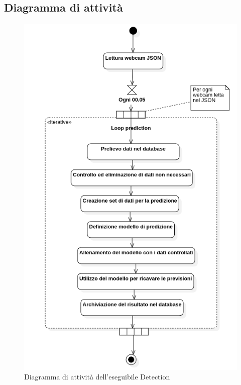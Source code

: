 \subsection{Diagramma di attività}\label{ArchitetturaDelProdottoArchitetturaModuloPredictionDiagrammaDiAttività}
\begin{figure}[H]
  \begin{center}
    \includegraphics[scale=0.6]{../immagini/diag_PB/prediction_activity.png}
    \caption{Diagramma di attività dell'eseguibile Detection}
  \end{center}
\end{figure}



